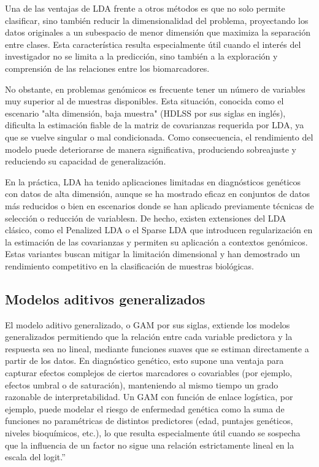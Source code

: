 \documentclass[11pt,a4paper,spanish]{book}
\numberwithin{equation}{chapter}
\numberwithin{figure}{chapter}
\begin{document}
Una de las ventajas de LDA frente a otros métodos es que no solo permite clasificar, sino también reducir la dimensionalidad del problema, proyectando los datos originales a un subespacio de menor dimensión que maximiza la separación entre clases\cite{Ghojogh_2019}. Esta característica resulta especialmente útil cuando el interés del investigador no se limita a la predicción, sino también a la exploración y comprensión de las relaciones entre los biomarcadores\cite{CHEN2012}.

No obstante, en problemas genómicos es frecuente tener un número de variables muy superior al de muestras disponibles. Esta situación, conocida como el escenario "alta dimensión, baja muestra" (HDLSS por sus siglas en inglés), dificulta la estimación fiable de la matriz de covarianzas requerida por LDA, ya que se vuelve singular o mal condicionada. Como consecuencia, el rendimiento del modelo puede deteriorarse de manera significativa, produciendo sobreajuste y reduciendo su capacidad de generalización\cite{1364-503X,CHEN2012}.

En la práctica, LDA ha tenido aplicaciones limitadas en diagnósticos genéticos con datos de alta dimensión, aunque se ha mostrado eficaz en conjuntos de datos más reducidos o bien en escenarios donde se han aplicado previamente técnicas de selección o reducción de variablesn\cite{1364-503X,CHEN2012}. De hecho, existen extensiones del LDA clásico, como el Penalized LDA o el Sparse LDA\cite{Witten2011,Clemmensen2011} que introducen regularización en la estimación de las covarianzas y permiten su aplicación a contextos genómicos. Estas variantes buscan mitigar la limitación dimensional y han demostrado un rendimiento competitivo en la clasificación de muestras biológicas.

\subsection{Modelos aditivos generalizados}
El modelo aditivo generalizado, o GAM por sus siglas, extiende los modelos generalizados permitiendo que la relación entre cada variable predictora y la respuesta sea no lineal, mediante funciones suaves que se estiman directamente a partir de los datos\cite{Hastie1986}. En diagnóstico genético, esto supone una ventaja para capturar efectos complejos de ciertos marcadores o covariables (por ejemplo, efectos umbral o de saturación), manteniendo al mismo tiempo un grado razonable de interpretabilidad. Un GAM con función de enlace logística, por ejemplo, puede modelar el riesgo de enfermedad genética como la suma de funciones no paramétricas de distintos predictores (edad, puntajes genéticos, niveles bioquímicos, etc.), lo que resulta especialmente útil cuando se sospecha que la influencia de un factor no sigue una relación estrictamente lineal en la escala del logit\cite{10.1093/bioinformatics/btx150}.”
\end{document}
